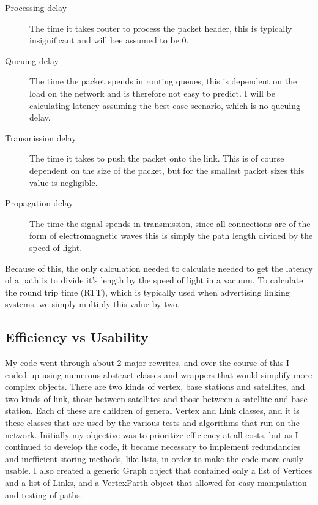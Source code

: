 \documentclass[12pt,a4paper,twoside,openright]{report}
\begin{document}
\begin{description}
\item[Processing delay] The time it takes router to process the packet header, this is typically insignificant and will bee assumed to be 0.
\item[Queuing delay]  The time the packet spends in routing queues, this is dependent on the load on the network and is therefore not easy to predict. I will be calculating latency assuming the best case scenario, which is no queuing delay.
\item[Transmission delay] The time it takes to push the packet onto the link. This is of course dependent on the size of the packet, but for the smallest packet sizes this value is negligible. 
\item[Propagation delay] The time the signal spends in transmission, since all connections are of the form of electromagnetic waves this is simply the path length divided by the speed of light.
\end{description}

Because of this, the only calculation needed to calculate needed to get the latency of a path is to divide it's length by the speed of light in a vacuum. To calculate the round trip time (RTT), which is typically used when advertising linking systems, we simply multiply this value by two.

\subsection{Efficiency vs Usability}
My code went through about 2 major rewrites, and over the course of this I ended up using numerous abstract classes and wrappers that would simplify more complex objects. There are two kinds of vertex, base stations and satellites, and two kinds of link, those between satellites and those between a satellite and base station. Each of these are children of general Vertex and Link classes, and it is these classes that are used by the various tests and algorithms that run on the network. Initially my objective was to prioritize efficiency at all costs, but as I continued to develop the code, it became necessary to implement redundancies and inefficient storing methods, like lists, in order to make the code more easily usable. I also created a generic Graph object that contained only a list of Vertices and a list of Links, and a VertexParth object that allowed for easy manipulation and testing of paths.
\end{document}
